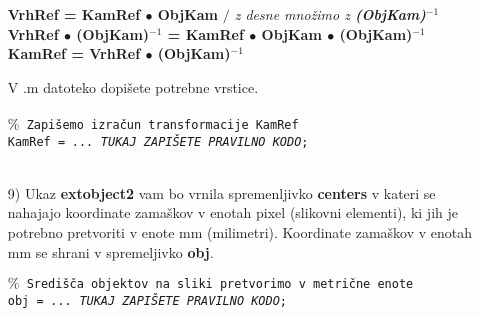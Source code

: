 \begin{enumerate}
\noindent %
\begin{mdframed}[backgroundcolor=green!20, shadow=true,roundcorner=8pt]
        \vspace{0.1cm}
        \center
        \textbf{VrhRef = KamRef $\bullet$  ObjKam} \emph{$/$ z desne množimo z \textbf{(ObjKam)$^{-1}$}}\\ %
        \vspace{0.2cm}
        \textbf{VrhRef $\bullet$ (ObjKam)$^{-1}$ = KamRef $\bullet$ ObjKam $\bullet$ (ObjKam)$^{-1}$}\\ %
        \vspace{0.2cm}
        \textbf{KamRef = VrhRef $\bullet$ (ObjKam)$^{-1}$}\\ %
        \vspace{0.1cm}
\end{mdframed}
\vspace{0.0cm} %

V .m datoteko dopišete potrebne vrstice. \\ %
\\
\small
\textcolor[rgb]{0.50,0.50,0.50}{\texttt{$\%$ Zapišemo izračun transformacije KamRef}} \\%
\texttt{KamRef = \emph{... TUKAJ ZAPIŠETE PRAVILNO KODO};}  \\%
\\
\normalsize %

\item[9)] Ukaz \textbf{extobject2} vam bo vrnila spremenljivko \textbf{centers} v kateri se nahajajo koordinate zamaškov v enotah pixel (slikovni elementi), ki jih je potrebno pretvoriti v enote mm (milimetri). Koordinate zamaškov v enotah mm se shrani v spremeljivko \textbf{obj}.

\small
\textcolor[rgb]{0.50,0.50,0.50}{\texttt{$\%$ Središča objektov na sliki pretvorimo v metrične enote}} \\%
\texttt{obj = \emph{... TUKAJ ZAPIŠETE PRAVILNO KODO};} \\ %
\\


\end{enumerate}
